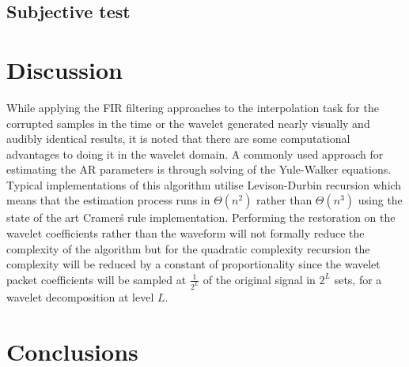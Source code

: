 \subsection{Subjective test}


\section{Discussion}

While applying the FIR filtering approaches to the interpolation task for the corrupted samples in the time or the wavelet generated nearly visually and audibly identical results, it is noted that there are some computational advantages to doing it in the wavelet domain. A commonly used approach for estimating the AR parameters is through solving of the Yule-Walker equations. Typical implementations of this algorithm utilise Levison-Durbin recursion which means that the estimation process runs in $\Theta(n^2)$\cite{Hayes1996} rather than $\Theta(n^3)$ using the state of the art Cramer\'s rule implementation\cite{Habgood2012}. Performing the restoration on the wavelet coefficients rather than the waveform will not formally reduce the complexity of the algorithm but for the quadratic complexity recursion the complexity will be reduced by a constant of proportionality since the wavelet packet coefficients will be sampled at $\frac{1}{2^L}$ of the original signal in $2^L$ sets, for a wavelet decomposition at level $L$.

\section{Conclusions}



